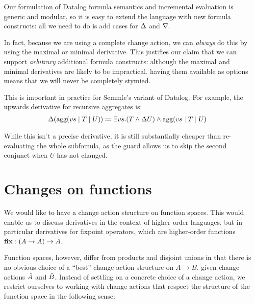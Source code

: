 Our formulation of Datalog formula semantics and incremental evaluation is 
generic and modular, so it is easy to extend the language with new
formula constructs: all we need to do is add cases for $\Delta$ and $\nabla$.

In fact, because we are using a complete change action, we can \emph{always} do this by using the maximal or
minimal derivative. This justifies our claim that we can support
\emph{arbitrary} additional formula constructs: although the maximal and minimal
derivatives are likely to be impractical, having them
available as options means that we will never be completely stymied.

This is important in practice for Semmle's variant of Datalog. For example, the
upwards derivative for recursive aggregates \autocite{demoor2013aggregates} is:
\begin{align*}
  \Delta(\textrm{agg}(vs \mid T \mid U)) \coloneqq \exists vs. (T \wedge \Delta{U}) \wedge \textrm{agg}(vs \mid T \mid U)
\end{align*}

While this isn't a precise derivative, it is still substantially cheaper than
re-evaluating the whole subfomula, as the guard allows us to skip the second conjunct when $U$
has not changed.

\section{Changes on functions}


We would like to have a change action structure on function spaces. This would enable us
to discuss derivatives in the context of higher-order languages, but in particular derivatives for
fixpoint operators, which are higher-order functions $\mathbf{fix} : (A \rightarrow A) \rightarrow A$. 

Function spaces, however, differ from products and disjoint unions in that there is no obvious choice
of a ``best'' change action structure on $A \rightarrow B$, given change actions $\hat{A}$ and $\hat{B}$.
Instead of settling on a concrete choice of a change action, we restrict ourselves to working
with change actions that respect the structure of the function space in the following sense:


